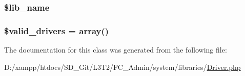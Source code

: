 \subsubsection[{\$lib\+\_\+name}]{\setlength{\rightskip}{0pt plus 5cm}\$lib\+\_\+name\hspace{0.3cm}{\ttfamily [protected]}}\label{class_c_i___driver___library_ab820c27413d5904686c58f6b2941b603}
\hypertarget{class_c_i___driver___library_a32d963b3d49fd67f188c1a74d38be6df}{}
\subsubsection[{\$valid\+\_\+drivers}]{\setlength{\rightskip}{0pt plus 5cm}\$valid\+\_\+drivers = array()\hspace{0.3cm}{\ttfamily [protected]}}\label{class_c_i___driver___library_a32d963b3d49fd67f188c1a74d38be6df}


The documentation for this class was generated from the following file\+:\begin{DoxyCompactItemize}
\item 
D\+:/xampp/htdocs/\+S\+D\+\_\+\+Git/\+L3\+T2/\+F\+C\+\_\+\+Admin/system/libraries/\hyperlink{system_2libraries_2_driver_8php}{Driver.\+php}\end{DoxyCompactItemize}
